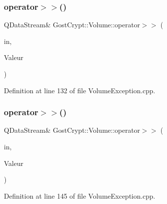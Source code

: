 \subsubsection{\texorpdfstring{operator$>$$>$()}{operator>>()}\hspace{0.1cm}{\footnotesize\ttfamily [9/19]}}
{\footnotesize\ttfamily Q\+Data\+Stream\& Gost\+Crypt\+::\+Volume\+::operator$>$$>$ (\begin{DoxyParamCaption}\item[{Q\+Data\+Stream \&}]{in,  }\item[{\hyperlink{class_gost_crypt_1_1_volume_1_1_volume_read_only}{Gost\+Crypt\+::\+Volume\+::\+Volume\+Read\+Only} \&}]{Valeur }\end{DoxyParamCaption})}



Definition at line 132 of file Volume\+Exception.\+cpp.

\mbox{\label{namespace_gost_crypt_1_1_volume_ac098df2452bbbac996b550b685b71ea0}} 
\subsubsection{\texorpdfstring{operator$>$$>$()}{operator>>()}\hspace{0.1cm}{\footnotesize\ttfamily [10/19]}}
{\footnotesize\ttfamily Q\+Data\+Stream\& Gost\+Crypt\+::\+Volume\+::operator$>$$>$ (\begin{DoxyParamCaption}\item[{Q\+Data\+Stream \&}]{in,  }\item[{\hyperlink{class_gost_crypt_1_1_volume_1_1_volume_protected}{Gost\+Crypt\+::\+Volume\+::\+Volume\+Protected} \&}]{Valeur }\end{DoxyParamCaption})}



Definition at line 145 of file Volume\+Exception.\+cpp.

\mbox{\label{namespace_gost_crypt_1_1_volume_ad8380b8bdb6f81298284dcdf49f45085}} 
